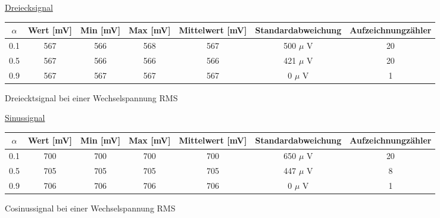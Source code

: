  
    \vspace{1.5em}
                 
    \underline{Dreiecksignal}
        
            \hspace{-4em}           
                 \begin{tabular}{|c|c|c|c|c|c|c|}                 
                  \hline
                   $\alpha $ & Wert [mV] & Min [mV] & Max [mV] & Mittelwert [mV]
                   & Standardabweichung & Aufzeichnungzähler\\ \hline 
                   0.1 & 567 & 566 & 568 & 567 & 500 $\mu$ V & 20 \\ \hline
                   0.5 & 567 & 566 & 566 & 566 & 421 $\mu$ V & 20 \\ \hline
                   0.9 & 567 & 567 & 567 & 567 & 0 $\mu$ V & 1 \\ \hline
                 \end{tabular}
                       \caption{Dreiecktsignal bei einer Wechselspannung RMS}
                        \label{tablelabel2}
             
     
    \vspace{1.5em}
             
    \underline{Sinussignal}
        
            \hspace{-4em}                 
                 \begin{tabular}{|c|c|c|c|c|c|c|}
                  \hline
                   $\alpha $ & Wert [mV] & Min [mV] & Max [mV] & Mittelwert [mV]
                   & Standardabweichung & Aufzeichnungzähler\\ \hline 
                   0.1 & 700 & 700 & 700 & 700 & 650 $\mu$ V & 20 \\ \hline
                   0.5 & 705 & 705 & 705 & 705 & 447 $\mu$ V & 8 \\ \hline
                   0.9 & 706 & 706 & 706 & 706 & 0 $\mu$ V & 1 \\ \hline
                 \end{tabular}          
                       \caption{Cosinussignal bei einer Wechselspannung RMS}
                        \label{tablelabel3}
            
    



